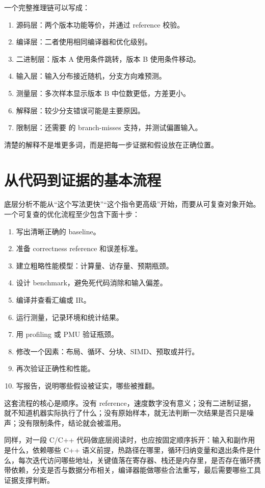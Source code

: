 一个完整推理链可以写成：

\begin{enumerate}
  \item 源码层：两个版本功能等价，并通过 reference 校验。
  \item 编译层：二者使用相同编译器和优化级别。
  \item 二进制层：版本 A 使用条件跳转，版本 B 使用条件移动。
  \item 输入层：输入分布接近随机，分支方向难预测。
  \item 测量层：多次样本显示版本 B 中位数更低，方差更小。
  \item 解释层：较少分支错误可能是主要原因。
  \item 限制层：还需要  的 branch-misses 支持，并测试偏置输入。
\end{enumerate}

清楚的解释不是堆更多词，而是把每一步证据和假设放在正确位置。

\section{从代码到证据的基本流程}

底层分析不能从“这个写法更快”“这个指令更高级”开始，而要从可复查对象开始。一个可复查的优化流程至少包含下面十步：

\begin{enumerate}
  \item 写出清晰正确的 baseline。
  \item 准备 correctness reference 和误差标准。
  \item 建立粗略性能模型：计算量、访存量、预期瓶颈。
  \item 设计 benchmark，避免死代码消除和输入偏差。
  \item 编译并查看汇编或 IR。
  \item 运行测量，记录环境和统计结果。
  \item 用 profiling 或 PMU 验证瓶颈。
  \item 修改一个因素：布局、循环、分块、SIMD、预取或并行。
  \item 再次验证正确性和性能。
  \item 写报告，说明哪些假设被证实，哪些被推翻。
\end{enumerate}

这套流程的核心是顺序。没有 reference，速度数字没有意义；没有二进制证据，就不知道机器实际执行了什么；没有原始样本，就无法判断一次结果是否只是噪声；没有限制条件，结论就会被滥用。

同样，对一段 C/C++ 代码做底层阅读时，也应按固定顺序拆开：输入和副作用是什么，依赖哪些 C++ 语义前提，热路径在哪里，循环归纳变量和退出条件是什么，每次迭代访问哪些地址，关键值落在寄存器、栈还是内存里，是否存在循环携带依赖，分支是否与数据分布相关，编译器能做哪些合法重写，最后需要哪些工具证据支撑判断。


